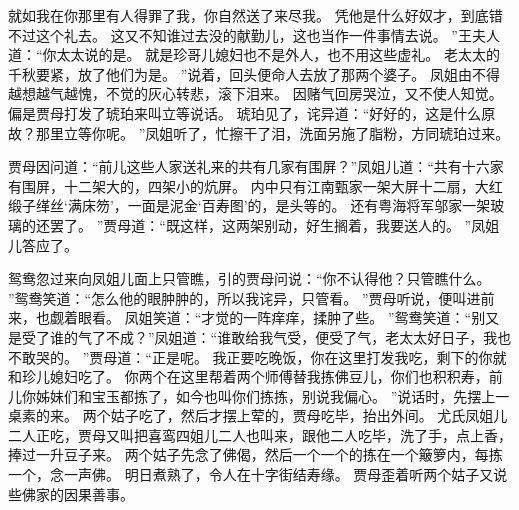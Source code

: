 就如我在你那里有人得罪了我，你自然送了来尽我。
凭他是什么好奴才，到底错不过这个礼去。
这又不知谁过去没的献勤儿，这也当作一件事情去说。
”王夫人道：“你太太说的是。
就是珍哥儿媳妇也不是外人，也不用这些虚礼。
老太太的千秋要紧，放了他们为是。
”说着，回头便命人去放了那两个婆子。
凤姐由不得越想越气越愧，不觉的灰心转悲，滚下泪来。
因赌气回房哭泣，又不使人知觉。
偏是贾母打发了琥珀来叫立等说话。
琥珀见了，诧异道：“好好的，这是什么原故？那里立等你呢。
”凤姐听了，忙擦干了泪，洗面另施了脂粉，方同琥珀过来。
\par
贾母因问道：“前儿这些人家送礼来的共有几家有围屏？”凤姐儿道：“共有十六家有围屏，十二架大的，四架小的炕屏。
内中只有江南甄家一架大屏十二扇，大红缎子缂丝‘满床笏’，一面是泥金‘百寿图’的，是头等的。
还有粤海将军邬家一架玻璃的还罢了。
”贾母道：“既这样，这两架别动，好生搁着，我要送人的。
”凤姐儿答应了。
\par
鸳鸯忽过来向凤姐儿面上只管瞧，引的贾母问说：“你不认得他？只管瞧什么。
”鸳鸯笑道：“怎么他的眼肿肿的，所以我诧异，只管看。
”贾母听说，便叫进前来，也觑着眼看。
凤姐笑道：“才觉的一阵痒痒，揉肿了些。
”鸳鸯笑道：“别又是受了谁的气了不成？”凤姐道：“谁敢给我气受，便受了气，老太太好日子，我也不敢哭的。
”贾母道：“正是呢。
我正要吃晚饭，你在这里打发我吃，剩下的你就和珍儿媳妇吃了。
你两个在这里帮着两个师傅替我拣佛豆儿，你们也积积寿，前儿你姊妹们和宝玉都拣了，如今也叫你们拣拣，别说我偏心。
”说话时，先摆上一桌素的来。
两个姑子吃了，然后才摆上荤的，贾母吃毕，抬出外间。
尤氏凤姐儿二人正吃，贾母又叫把喜鸾四姐儿二人也叫来，跟他二人吃毕，洗了手，点上香，捧过一升豆子来。
两个姑子先念了佛偈，然后一个一个的拣在一个簸箩内，每拣一个，念一声佛。
明日煮熟了，令人在十字街结寿缘。
贾母歪着听两个姑子又说些佛家的因果善事。
